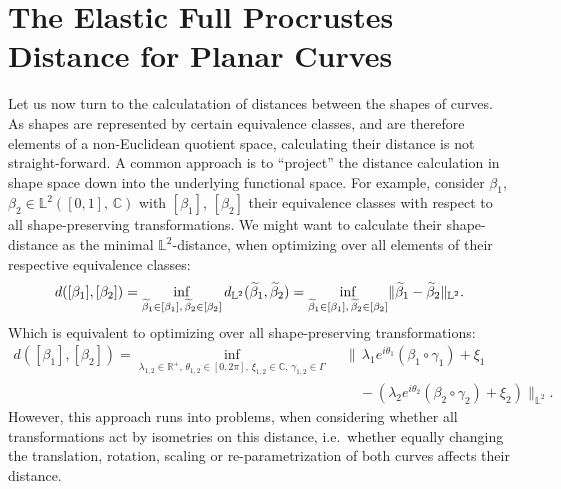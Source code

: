 \section{The Elastic Full Procrustes Distance for Planar Curves}
\label{theo:dist}
Let us now turn to the calculatation of distances between the shapes of curves.
As shapes are represented by certain equivalence classes, and are therefore elements of a non-Euclidean quotient space, calculating their distance is not straight-forward.
A common approach is to \enquote{project} the distance calculation in shape space down into the underlying functional space.
For example, consider $\beta_1$, $\beta_2 \in \mathbb{L}^2([0,1],\, \mathbb{C})$ with $[\beta_1]$, $[\beta_2]$ their equivalence classes with respect to all shape-preserving transformations.
We might want to calculate their shape-distance as the minimal $\mathbb{L}^2$-distance, when optimizing over all elements of their respective equivalence classes:
$$ d([\beta_1], [\beta_2]) = \inf_{\widetilde \beta_1 \in [\beta_1],\,\widetilde \beta_2 \in [\beta_2]} d_{\mathbb{L}^2}(\widetilde \beta_1, \widetilde \beta_2) = \inf_{\widetilde\beta_1 \in [\beta_1],\, \widetilde\beta_2 \in [\beta_2]} \lVert \widetilde\beta_1 - \widetilde\beta_2\rVert_{\mathbb{L}^2}.$$
Which is equivalent to optimizing over all shape-preserving transformations:
\begin{align*}
  d([\beta_1], [\beta_2]) = \inf_{\lambda_{1,2} \in \mathbb{R}^+,\,\theta_{1,2} \in [0,2\pi],\, \xi_{1,2} \in \mathbb{C},\, \gamma_{1,2} \in \Gamma}\,\, & \bigg\lVert \,\lambda_1 e^{i\theta_1}(\beta_1 \circ \gamma_1) + \xi_1 \\
  &\quad - \left(\lambda_2 e^{i\theta_2}(\beta_2 \circ \gamma_2) + \xi_2 \right) \bigg\rVert_{\mathbb{L}^2}.
\end{align*}
However, this approach runs into problems, when considering whether all transformations act by isometries on this distance, i.e.\ whether equally changing the translation, rotation, scaling or re-parametrization of both curves affects their distance. 

